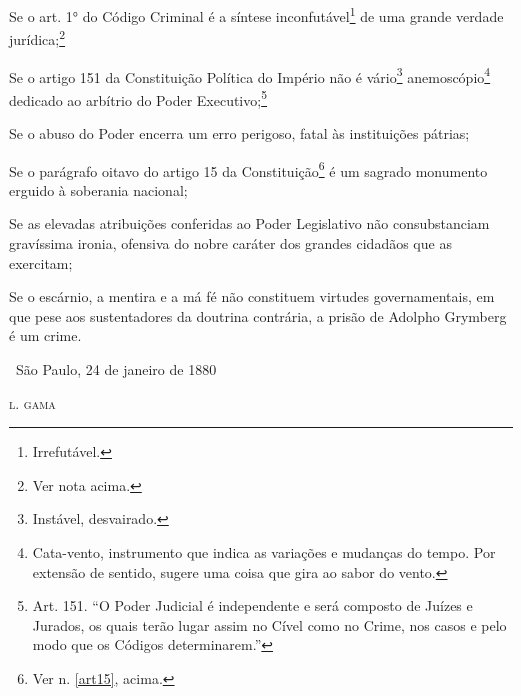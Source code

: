 \asterisc

Se o art. 1° do Código Criminal é a síntese inconfutável\footnote{
  Irrefutável.} de uma grande verdade jurídica;\footnote{Ver nota
  acima.} %

Se o artigo 151 da Constituição Política do Império não é
vário\footnote{Instável, desvairado.} anemoscópio\footnote{
  Cata-vento, instrumento que indica as variações e mudanças do tempo.
  Por extensão de sentido, sugere uma coisa que gira ao sabor do vento.}
dedicado ao arbítrio do Poder Executivo;\footnote{Art. 151. ``O Poder
  Judicial é independente e será composto de Juízes e Jurados, os
  quais terão lugar assim no Cível como no Crime, nos casos e pelo modo
  que os Códigos determinarem.''}

Se o abuso do Poder encerra um erro perigoso, fatal às instituições
pátrias; %

Se o parágrafo oitavo do artigo 15 da Constituição\footnote{Ver n. \ref{art15}, acima.} é um sagrado
monumento erguido à soberania nacional;

Se as elevadas atribuições conferidas ao Poder Legislativo não
consubstanciam gravíssima ironia, ofensiva do nobre caráter dos grandes
cidadãos que as exercitam;

Se o escárnio, a mentira e a má fé não constituem virtudes
governamentais, em que pese aos sustentadores da doutrina contrária, a
prisão de Adolpho Grymberg é um crime.\medskip

\hfill\ São Paulo, 24 de janeiro de 1880

\hfill\textsc{l. gama}

